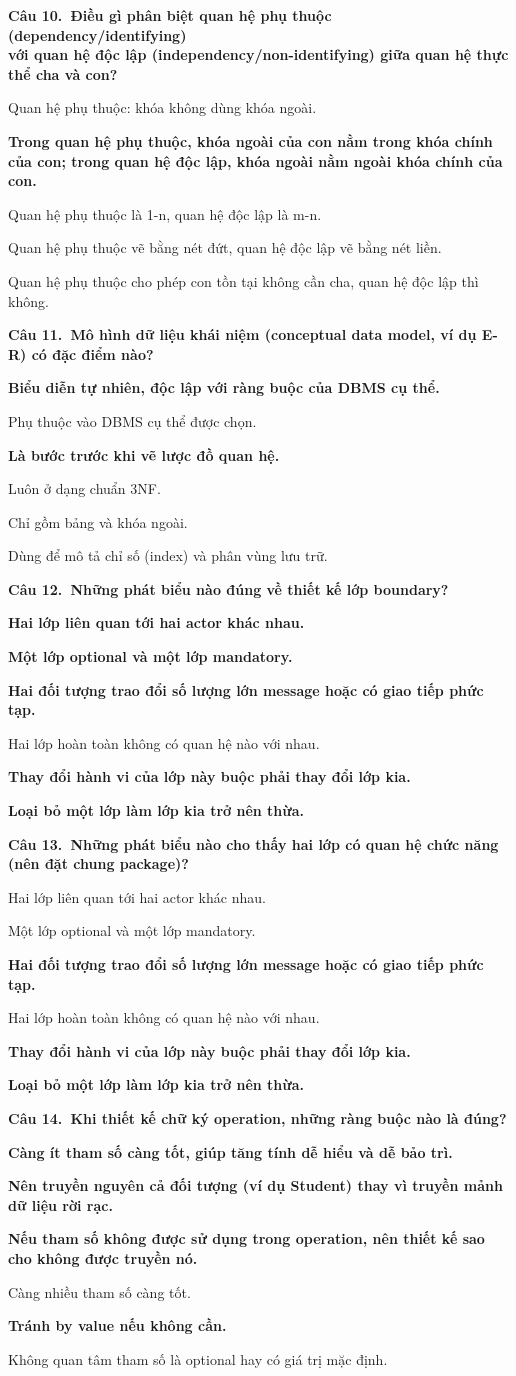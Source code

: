\documentclass[11pt,a4paper]{article}
\newcommand{\cau}[2]{\par\vspace{2pt}\noindent\textbf{Câu #1.\ #2}\par\vspace{1pt}}
\newenvironment{pa}{\begin{list}{}{\leftmargin=0.95cm\labelwidth=0.5cm\labelsep=0.3cm\itemsep=1pt\parsep=0pt\topsep=0pt\partopsep=0pt}}{\end{list}}
\newcommand{\A}{\item[A.]}
\newcommand{\B}{\item[B.]}
\newcommand{\C}{\item[C.]}
\newcommand{\D}{\item[D.]}
\newcommand{\E}{\item[E.]}
\newcommand{\F}{\item[F.]}
\begin{document}
\cau{10}{Điều gì phân biệt quan hệ phụ thuộc (dependency/identifying)\\ với quan hệ độc lập (independency/non-identifying) giữa quan hệ thực thể cha và con?}
\begin{pa}
\A Quan hệ phụ thuộc: khóa không dùng khóa ngoài.
\B {\bfseries Trong quan hệ phụ thuộc, khóa ngoài của con nằm trong khóa chính của con; trong quan hệ độc lập, khóa ngoài nằm ngoài khóa chính của con.}
\C Quan hệ phụ thuộc là 1-n, quan hệ độc lập là m-n.
\D Quan hệ phụ thuộc vẽ bằng nét đứt, quan hệ độc lập vẽ bằng nét liền.
\E Quan hệ phụ thuộc cho phép con tồn tại không cần cha, quan hệ độc lập thì không.
\end{pa}

\cau{11}{Mô hình dữ liệu khái niệm (conceptual data model, ví dụ E-R) có đặc điểm nào?}
\begin{pa}
\A {\bfseries Biểu diễn tự nhiên, độc lập với ràng buộc của DBMS cụ thể.}
\B Phụ thuộc vào DBMS cụ thể được chọn.
\C {\bfseries Là bước trước khi vẽ lược đồ quan hệ.}
\D Luôn ở dạng chuẩn 3NF.
\E Chỉ gồm bảng và khóa ngoài.
\F Dùng để mô tả chỉ số (index) và phân vùng lưu trữ.
\end{pa}

\cau{12}{Những phát biểu nào đúng về thiết kế lớp boundary?}
\begin{pa}
\A {\bfseries Hai lớp liên quan tới hai actor khác nhau.}
\B {\bfseries Một lớp optional và một lớp mandatory.}
\C {\bfseries Hai đối tượng trao đổi số lượng lớn message hoặc có giao tiếp phức tạp.}
\D Hai lớp hoàn toàn không có quan hệ nào với nhau.
\E {\bfseries Thay đổi hành vi của lớp này buộc phải thay đổi lớp kia.}
\F {\bfseries Loại bỏ một lớp làm lớp kia trở nên thừa.}
\end{pa}

\cau{13}{Những phát biểu nào cho thấy hai lớp có quan hệ chức năng (nên đặt chung package)?}
\begin{pa}
\A Hai lớp liên quan tới hai actor khác nhau.
\B Một lớp optional và một lớp mandatory.
\C {\bfseries Hai đối tượng trao đổi số lượng lớn message hoặc có giao tiếp phức tạp.}
\D Hai lớp hoàn toàn không có quan hệ nào với nhau.
\E {\bfseries Thay đổi hành vi của lớp này buộc phải thay đổi lớp kia.}
\F {\bfseries Loại bỏ một lớp làm lớp kia trở nên thừa.}
\end{pa}

\cau{14}{Khi thiết kế chữ ký operation, những ràng buộc nào là đúng?}
\begin{pa}
\A {\bfseries Càng ít tham số càng tốt, giúp tăng tính dễ hiểu và dễ bảo trì.}
\B {\bfseries Nên truyền nguyên cả đối tượng (ví dụ Student) thay vì truyền mảnh dữ liệu rời rạc.}
\C {\bfseries Nếu tham số không được sử dụng trong operation, nên thiết kế sao cho không được truyền nó.}
\D Càng nhiều tham số càng tốt.
\E {\bfseries Tránh by value nếu không cần.}
\F Không quan tâm tham số là optional hay có giá trị mặc định.
\end{pa}
\end{document}
